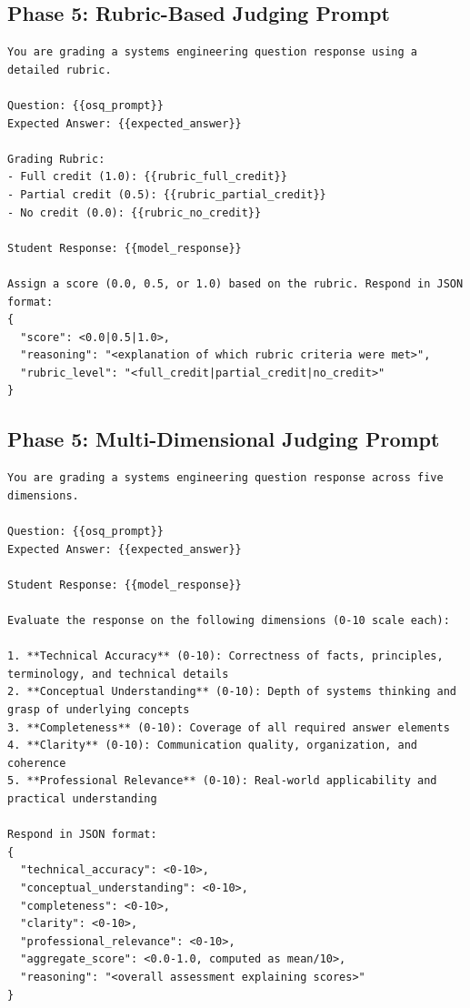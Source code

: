 \subsection{Phase 5: Rubric-Based Judging Prompt}

\begin{lstlisting}[basicstyle=\small\ttfamily,breaklines=true]
You are grading a systems engineering question response using a detailed rubric.

Question: {{osq_prompt}}
Expected Answer: {{expected_answer}}

Grading Rubric:
- Full credit (1.0): {{rubric_full_credit}}
- Partial credit (0.5): {{rubric_partial_credit}}
- No credit (0.0): {{rubric_no_credit}}

Student Response: {{model_response}}

Assign a score (0.0, 0.5, or 1.0) based on the rubric. Respond in JSON format:
{
  "score": <0.0|0.5|1.0>,
  "reasoning": "<explanation of which rubric criteria were met>",
  "rubric_level": "<full_credit|partial_credit|no_credit>"
}
\end{lstlisting}

\subsection{Phase 5: Multi-Dimensional Judging Prompt}

\begin{lstlisting}[basicstyle=\small\ttfamily,breaklines=true]
You are grading a systems engineering question response across five dimensions.

Question: {{osq_prompt}}
Expected Answer: {{expected_answer}}

Student Response: {{model_response}}

Evaluate the response on the following dimensions (0-10 scale each):

1. **Technical Accuracy** (0-10): Correctness of facts, principles, terminology, and technical details
2. **Conceptual Understanding** (0-10): Depth of systems thinking and grasp of underlying concepts
3. **Completeness** (0-10): Coverage of all required answer elements
4. **Clarity** (0-10): Communication quality, organization, and coherence
5. **Professional Relevance** (0-10): Real-world applicability and practical understanding

Respond in JSON format:
{
  "technical_accuracy": <0-10>,
  "conceptual_understanding": <0-10>,
  "completeness": <0-10>,
  "clarity": <0-10>,
  "professional_relevance": <0-10>,
  "aggregate_score": <0.0-1.0, computed as mean/10>,
  "reasoning": "<overall assessment explaining scores>"
}
\end{lstlisting}

